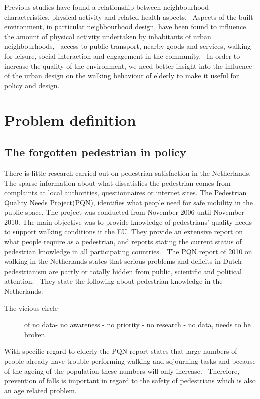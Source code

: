 Previous studies have found a relationship between neighbourhood characteristics, physical activity and related health aspects.~\cite{Borst2008} Aspects of the built environment, in particular neighbourhood design, have been found to influence the amount of physical activity undertaken by inhabitants of urban neighbourhoods,~\cite{Borst2008} access to public transport, nearby goods and services, walking for leisure, social interaction and engagement in the community.~\cite{Vine2012} In order to increase the quality of the environment, we need better insight into the influence of the urban design on the walking behaviour of elderly to make it useful for policy and design. 

\section{Problem definition}
\subsection{The forgotten pedestrian in policy}
There is little research carried out on pedestrian satisfaction in the Netherlands. The sparse information about what dissatisfies the pedestrian comes from complaints at local authorities, questionnaires or internet sites. The Pedestrian Quality Needs Project(PQN), identifies what people need for safe mobility in the public space. The project was conducted from November 2006 until November 2010. The main objective was to provide knowledge of pedestrians' quality needs to support walking conditions it the EU. They provide an extensive report on what people require as a pedestrian, and reports stating the current status of pedestrian knowledge in all participating countries.~\cite{Sauter2010} The PQN report of 2010 on walking in the Netherlands states that serious problems and deficits in Dutch pedestrianism are partly or totally hidden from public, scientific and political attention.~\cite{countryReport} They state the following about pedestrian knowledge in the Netherlands: 

\begin{description}
\item[The vicious circle] of no data- no awareness - no priority - no research - no data, needs to be broken.~\cite{Sauter2010, countryReport}
\end{description} 

With specific regard to elderly the PQN report states that large numbers of people already have trouble performing walking and sojourning tasks and because of the ageing of the population these numbers will only increase.~\cite{Sauter2010} Therefore, prevention of falls is important in regard to the safety of pedestrians which is also an age related problem.~\cite{Sauter2010}


